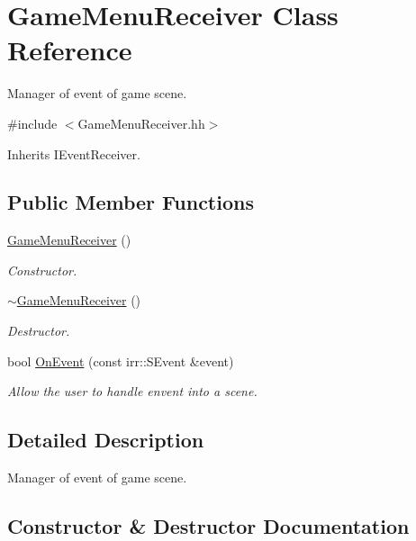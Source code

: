 \hypertarget{classGameMenuReceiver}{}\section{Game\+Menu\+Receiver Class Reference}
\label{classGameMenuReceiver}


Manager of event of game scene.  




{\ttfamily \#include $<$Game\+Menu\+Receiver.\+hh$>$}



Inherits I\+Event\+Receiver.

\subsection*{Public Member Functions}
\begin{DoxyCompactItemize}
\item 
\hyperlink{classGameMenuReceiver_a5dd735dbdeddd9f11a999c9f0c4210e8}{Game\+Menu\+Receiver} ()
\begin{DoxyCompactList}\small\item\em Constructor. \end{DoxyCompactList}\item 
\hyperlink{classGameMenuReceiver_a490afacab72bebb8b1f28c3977f9ed44}{$\sim$\+Game\+Menu\+Receiver} ()
\begin{DoxyCompactList}\small\item\em Destructor. \end{DoxyCompactList}\item 
bool \hyperlink{classGameMenuReceiver_af6774556abc7e3718b7bf904cc62ead0}{On\+Event} (const irr\+::\+S\+Event \&event)
\begin{DoxyCompactList}\small\item\em Allow the user to handle envent into a scene. \end{DoxyCompactList}\end{DoxyCompactItemize}


\subsection{Detailed Description}
Manager of event of game scene. 

\subsection{Constructor \& Destructor Documentation}
\mbox{\label{classGameMenuReceiver_a5dd735dbdeddd9f11a999c9f0c4210e8}} 
